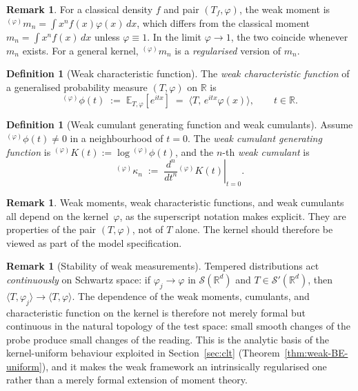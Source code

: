 \documentclass[12pt]{article}
\theoremstyle{definition}
\newtheorem{definition}[theorem]{Definition}
\newtheorem{remark}[theorem]{Remark}
\newcommand{\R}{\mathbb{R}}
\newcommand{\E}{\mathbb{E}}
\begin{document}
\begin{remark}\label{rem:weak-vs-classical}
For a classical density $f$ and pair $(T_f,\varphi)$, the weak moment is ${}^{(\varphi)}m_n = \int x^n f(x)\varphi(x)\,dx$, which differs from the classical moment $m_n = \int x^n f(x)\,dx$ unless $\varphi \equiv 1$.  In the limit $\varphi \to 1$, the two coincide whenever $m_n$ exists.  For a general kernel, ${}^{(\varphi)}m_n$ is a \emph{regularised} version of $m_n$.
\end{remark}

\begin{definition}[Weak characteristic function]\label{def:wcf}
The \emph{weak characteristic function} of a generalised probability measure $(T,\varphi)$ on $\R$ is
\[
{}^{(\varphi)}\phi(t)
\;:=\;
\E_{T,\varphi}[e^{itx}]
\;=\;
\langle T,\,e^{itx}\varphi(x)\rangle,
\qquad t\in\R.
\]
\end{definition}

\begin{definition}[Weak cumulant generating function and weak cumulants]\label{def:cumulants}
Assume ${}^{(\varphi)}\phi(t)\neq 0$ in a neighbourhood of $t=0$.  The \emph{weak cumulant generating function} is ${}^{(\varphi)}K(t):=\log {}^{(\varphi)}\phi(t)$, and the $n$-th \emph{weak cumulant} is
\[
{}^{(\varphi)}\kappa_n
\;:=\;
\left.\frac{d^n}{dt^n}{}^{(\varphi)}K(t)\right|_{t=0}.
\]
\end{definition}

\begin{remark}
Weak moments, weak characteristic functions, and weak cumulants all depend on the kernel~$\varphi$, as the superscript notation makes explicit.  They are properties of the pair $(T,\varphi)$, not of $T$ alone.  The kernel should therefore be viewed as part of the model specification.
\end{remark}

\begin{remark}[Stability of weak measurements]\label{rem:continuity}
Tempered distributions act \emph{continuously} on Schwartz space: if
$\varphi_j\to\varphi$ in $\mathcal{S}(\R^d)$ and $T\in\mathcal{S}'(\R^d)$, then
$\langle T,\varphi_j\rangle\to\langle T,\varphi\rangle$.  The dependence of the
weak moments, cumulants, and characteristic function on the kernel is therefore
not merely formal but continuous in the natural topology of the test space:
small smooth changes of the probe produce small changes of the reading.  This
is the analytic basis of the kernel-uniform behaviour exploited in
Section~\ref{sec:clt} (Theorem~\ref{thm:weak-BE-uniform}), and it makes the weak
framework an intrinsically regularised one rather than a merely formal
extension of moment theory.
\end{remark}
\end{document}

